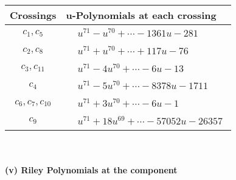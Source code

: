 \documentclass[1p]{elsarticle_modified}
\theoremstyle{definition}
\begin{document}
\begin{tabular}{m{50pt}|m{274pt}}
Crossings & \hspace{64pt}u-Polynomials at each crossing \\
\hline $$\begin{aligned}c_{1},c_{5}\end{aligned}$$&$\begin{aligned}
&u^{71}- u^{70}+\cdots-1361 u-281
\end{aligned}$\\
\hline $$\begin{aligned}c_{2},c_{8}\end{aligned}$$&$\begin{aligned}
&u^{71}+u^{70}+\cdots+117 u-76
\end{aligned}$\\
\hline $$\begin{aligned}c_{3},c_{11}\end{aligned}$$&$\begin{aligned}
&u^{71}-4 u^{70}+\cdots-6 u-13
\end{aligned}$\\
\hline $$\begin{aligned}c_{4}\end{aligned}$$&$\begin{aligned}
&u^{71}-5 u^{70}+\cdots-8378 u-1711
\end{aligned}$\\
\hline $$\begin{aligned}c_{6},c_{7},c_{10}\end{aligned}$$&$\begin{aligned}
&u^{71}+3 u^{70}+\cdots-6 u-1
\end{aligned}$\\
\hline $$\begin{aligned}c_{9}\end{aligned}$$&$\begin{aligned}
&u^{71}+18 u^{69}+\cdots-57052 u-26357
\end{aligned}$\\
\hline
\end{tabular}\\~\\
\newpage\renewcommand{\arraystretch}{1}
\flushleft \textbf{(v) Riley Polynomials at the component}\newline \\
\end{document}
